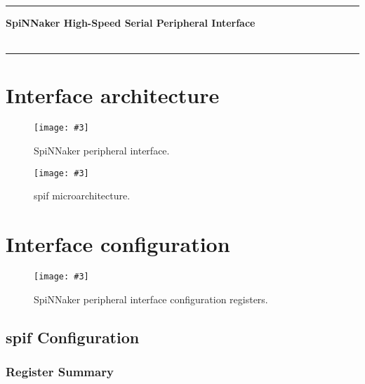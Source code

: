 \documentclass[11pt,a4paper,twoside]{article}
\newcommand{\image}[5][]
{
\begin{figure}[#2]
   \begin{center}
      \texttt{[image: \#3]}
      \caption{#5}
      \label{fig:#4}
   \end{center}
\end{figure}
}
\begin{document}
\rule{\linewidth}{2pt}

\begin{center}
	\textbf{
		\Large{SpiNNaker High-Speed Serial Peripheral Interface} \\
		\vspace*{0.5cm}
		\large {\myversion} \\
		\large{\mydate}
	}
\end{center}

\rule{\linewidth}{2pt}

\vspace*{1.0cm}


\section{Interface architecture}

\image[width = \textwidth]{!h}{spin_per_if}{fig:spin_if}
	{SpiNNaker peripheral interface.}


\image[width = \textwidth]{!h}{spif_bd}{fig:spif_bd}
{spif microarchitecture.}


\clearpage
\section{Interface configuration}

\image[width = 0.9 \textwidth]{!h}{spif_cf}{fig:spif_cf}
{SpiNNaker peripheral interface configuration registers.}


\clearpage
\subsection{spif Configuration}


\subsubsection*{Register Summary}
\end{document}

